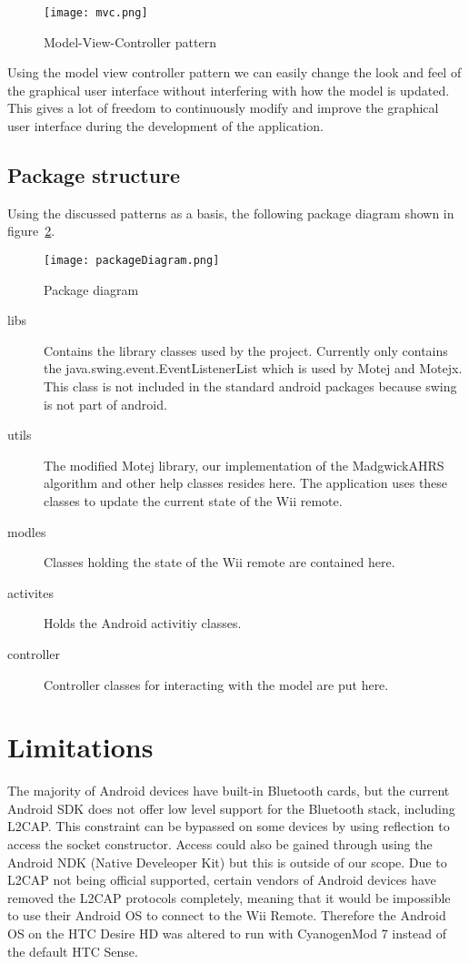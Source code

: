 \begin{figure}[h!]
  \centering
    \texttt{[image: mvc.png]}
    \caption{\footnotesize Model-View-Controller pattern}
    \label{fig:mvc}
\end{figure}

Using the model view controller pattern we can easily change the look and feel of the graphical user interface without interfering with how the model is updated. This gives a lot of freedom to continuously modify and improve the graphical user interface during the development of the application. 

\subsection{Package structure}
Using the discussed patterns as a basis, the following package diagram shown in figure~\ref{fig:packageDiagram}. 

\begin{figure}[h!]
  \centering
    \texttt{[image: packageDiagram.png]}
    \caption{\footnotesize Package diagram}
    \label{fig:packageDiagram}
\end{figure}

\begin{description}
	\item[libs] Contains the library classes used by the project. Currently only contains the java.swing.event.EventListenerList which is used by Motej and Motejx. This class is not included in the standard android packages because swing is not part of android.
	\item[utils] The modified Motej library, our implementation of the MadgwickAHRS algorithm and other help classes resides here. The application uses these classes to update the current state of the Wii remote. 
	\item[modles] Classes holding the state of the Wii remote are contained here.
	\item[activites] Holds the Android activitiy classes.
	\item[controller] Controller classes for interacting with the model are put here.
\end{description}

\section{Limitations}
The majority of Android devices have built-in Bluetooth cards, but the current Android SDK does not offer low level support for the Bluetooth stack, including L2CAP. This constraint can be bypassed on some devices by using reflection to access the socket constructor\cite{l2capHtc}. Access could also be gained through using the Android NDK (Native Develeoper Kit) but this is outside of our scope. Due to L2CAP not being official supported, certain vendors of Android devices have removed the L2CAP protocols completely, meaning that it would be impossible to use their Android OS to connect to the Wii Remote. Therefore the Android OS on the HTC Desire HD was altered to run with CyanogenMod 7 instead of the default HTC Sense.

